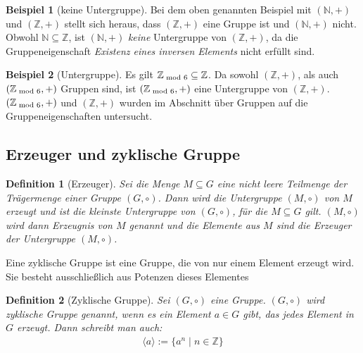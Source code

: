 \documentclass[12pt,a4paper, usenames, dvipsnames]{article}
\theoremstyle{mystyle}
\newtheorem{definition}{Definition}
\theoremstyle{definition}
\newtheorem{bsp}{Beispiel}[definition]
\begin{document}
\begin{bsp}[keine Untergruppe]

Bei dem oben genannten Beispiel mit $(\mathbb{N},+)$ und $(\mathbb{Z},+)$ stellt sich heraus, dass $(\mathbb{Z},+)$ eine Gruppe ist und $(\mathbb{N},+)$ nicht. Obwohl $\mathbb{N \subseteq \mathbb{Z}}$, ist $(\mathbb{N},+)$ \textit{keine} Untergruppe von $(\mathbb{Z},+)$, da die Gruppeneigenschaft \textit{Existenz eines inversen Elements} nicht erfüllt sind.

\end{bsp}
\begin{bsp}[Untergruppe]

Es gilt $\mathbb{Z}_{\hspace*{-0.3em}\mod 6} \subseteq \mathbb{Z}$. Da sowohl $(\mathbb{Z},+)$, als auch $(\mathbb{Z}_{\hspace*{-0.3em}\mod 6}, +)$ Gruppen sind, ist $(\mathbb{Z}_{\hspace*{-0.3em}\mod 6}, +)$ eine Untergruppe von $(\mathbb{Z},+)$. $(\mathbb{Z}_{\hspace*{-0.3em}\mod 6}, +)$ und $(\mathbb{Z},+)$ wurden im Abschnitt über Gruppen auf die Gruppeneigenschaften untersucht.

\end{bsp}

%
%
%
%
%
%
%
%
%
%

\subsection{Erzeuger und zyklische Gruppe} 
\label{Abschnitt_Erzeuger}


\begin{definition}[Erzeuger]
Sei die Menge $M \subseteq G$ eine nicht leere Teilmenge der Trägermenge einer Gruppe $(G, \circ)$. 
Dann wird die Untergruppe $(M, \circ)$ von $M$ erzeugt und ist die kleinste Untergruppe von $(G, \circ)$, für die $M \subseteq G$ gilt.
$(M, \circ)$ wird dann Erzeugnis von $M$ genannt und die Elemente aus $M$ sind die Erzeuger der Untergruppe $(M, \circ)$.
\end{definition}

Eine zyklische Gruppe ist eine Gruppe, die von nur einem Element erzeugt wird. Sie besteht ausschließlich aus Potenzen dieses Elementes

\begin{definition}[Zyklische Gruppe]
Sei $(G, \circ)$ eine Gruppe. $(G, \circ)$ wird zyklische Gruppe genannt, wenn es ein Element $a \in G$ gibt, das jedes Element in $G$ erzeugt. Dann schreibt man auch:
\begin{align*}
\langle a \rangle := \{ a^n \mid n \in \mathbb{Z} \}
\end{align*}

\end{definition}
\end{document}
